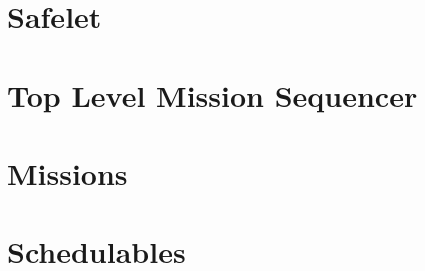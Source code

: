 \documentclass[10pt,a4paper]{article}
\begin{document}
\section{Safelet}

\newpage

\section{Top Level Mission Sequencer}

\newpage

\section{Missions}

\newpage

\section{Schedulables}

\newpage

\end{document}
